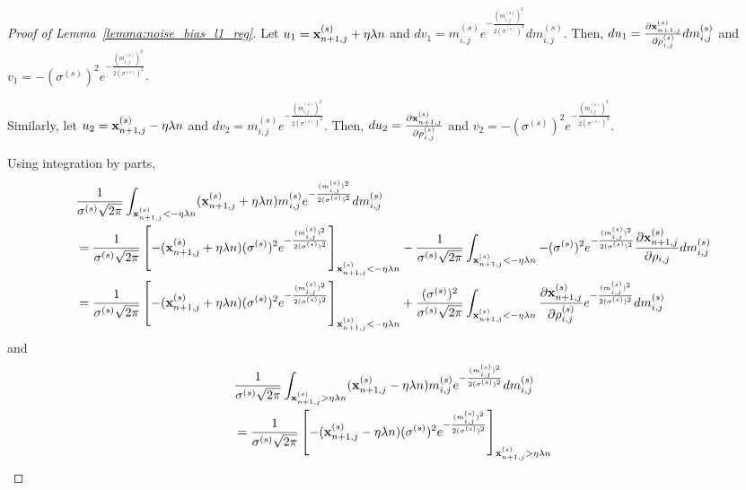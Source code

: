 \begin{proof}[Proof of Lemma~\ref{lemma:noise_bias_l1_reg}]
Let $u_1 = {\mathbf{x}}_{n+1,j}^{(s)} + \eta \lambda n$ and $d v_1 = m_{i,j}^{(s)} e^{-\frac{(m_{i,j}^{(s)})^2}{2 (\sigma^{(s)})^2}} dm_{i, j}^{(s)}$. 
Then, $d u_1 = \frac{\partial {\mathbf{x}}_{n+1,j}^{(s)}}{\partial \rho_{i, j}^{(s)}} d m_{i,j}^{(s)}$ and $v_1 = -(\sigma^{(s)})^2 e^{-\frac{(m_{i,j}^{(s)})^2}{2 (\sigma^{(s)})^2}}$.

Similarly, let $u_2 = {\mathbf{x}}_{n+1,j}^{(s)} - \eta \lambda n$ and $d v_2 = m_{i,j}^{(s)} e^{-\frac{(m_{i,j}^{(s)})^2}{2 (\sigma^{(s)})^2}}$. Then, $d u_2 = \frac{\partial {\mathbf{x}}_{n+1,j}^{(s)}}{\partial \rho_{i, j}^{(s)}}$ and $v_2 = -(\sigma^{(s)})^2 e^{-\frac{(m_{i,j}^{(s)})^2}{2 (\sigma^{(s)})^2}}$.



Using integration by parts,
\begin{align}
    &\frac{1}{\sigma^{(s)} \sqrt{2\pi}}
    \int_{{\mathbf{x}}_{n+1, j}^{(s)} < -\eta \lambda n} 
        ({\mathbf{x}}_{n+1,j}^{(s)} + \eta \lambda n)
        m_{i,j}^{(s)} e^{-\frac{(m_{i,j}^{(s)})^2}{2 (\sigma^{(s)})^2}} d m_{i,j}^{(s)}\\
    \nonumber
    &= \frac{1}{\sigma^{(s)} \sqrt{2\pi}}
    \left[ - ({\mathbf{x}}_{n+1,j}^{(s)} + \eta \lambda n) (\sigma^{(s)})^2 e^{-\frac{(m_{i,j}^{(s)})^2}{2(\sigma^{(s)})^2}} \right]_{{\mathbf{x}}_{n+1,j}^{(s)} < -\eta \lambda n}
    - \frac{1}{\sigma^{(s)} \sqrt{2\pi}}
    \int_{{\mathbf{x}}_{n+1, j}^{(s)} < -\eta \lambda n}
    - (\sigma^{(s)})^2 e^{-\frac{(m_{i,j}^{(s)} )^2}{2 (\sigma^{(s)})^2}} \frac{\partial {\mathbf{x}}_{n+1, j}^{(s)}}{\partial \rho_{i, j}} dm_{i,j}^{(s)}\\
\label{eq:appendix_l1_1}
    &= \frac{1}{\sigma^{(s)} \sqrt{2\pi}}
    \left[ - ({\mathbf{x}}_{n+1,j}^{(s)} + \eta \lambda n) (\sigma^{(s)})^2 e^{-\frac{(m_{i,j}^{(s)})^2}{2(\sigma^{(s)})^2}} \right]_{{\mathbf{x}}_{n+1,j}^{(s)} < -\eta \lambda n}
    + \frac{ (\sigma^{(s)})^2}{\sigma^{(s)} \sqrt{2\pi}} \int_{{\mathbf{x}}_{n+1, j}^{(s)} < - \eta \lambda n}
    \frac{\partial {\mathbf{x}}_{n+1,j}^{(s)}}{\partial \rho_{i, j}^{(s)}} e^{-\frac{(m_{i,j}^{(s)})^2}{2 (\sigma^{(s)})^2}} dm_{i,j}^{(s)}
\end{align}
and
\begin{align}
    &\frac{1}{\sigma^{(s)} \sqrt{2\pi}} 
        \int_{\rvx_{n+1,j}^{(s)} > \eta \lambda n} (\rvx_{n+1,j}^{(s)} - \eta \lambda n) 
        m_{i,j}^{(s)} e^{-\frac{(m_{i,j}^{(s)})^2}{2 (\sigma^{(s)})^2}} d m_{i,j}^{(s)}\\
    \nonumber
    &= \frac{1}{\sigma^{(s)} \sqrt{2\pi}}\left[
    - (\rvx_{n+1,j}^{(s)} - \eta \lambda n) (\sigma^{(s)})^2 e^{-\frac{(m_{i,j}^{(s)})^2}{2 (\sigma^{(s)})^2}}
    \right]_{\rvx_{n+1,j}^{(s)} > \eta \lambda n}

\end{align}
\end{proof}
